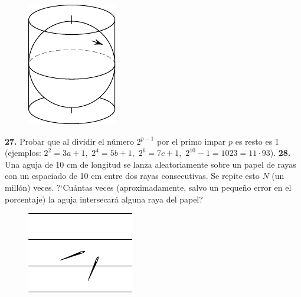 \documentclass[12pt, spanish]{article}  %
\begin{document}
\begin{figure}[h]
\centering
\footnotesize
\includegraphics[scale=1]{taskbook-10}
\end{figure}

\newpage
\noindent
{\bf 27.} Probar que al dividir el n\'umero $2^{p-1}$ por el primo impar $p$ es resto es 1
(ejemplos: $2^2 = 3a +1,$ $2^4 = 5b+1,$ $2^6 = 7c+1,$ 
$2^{10} - 1 = 1023 = 11\cdot 93$).  
\newline\newline\quad
{\bf 28.} Una aguja de 10 cm de longitud se lanza aleatoriamente sobre un papel de rayas con un espaciado de 10 cm entre dos rayas consecutivas. 
Se repite esto $N$ (un mill\'on) veces. 
?`Cu\'antas veces (aproximadamente, salvo un peque\~no error en el porcentaje) la aguja intersecar\'a alguna raya del papel?
\begin{figure}[h]
\centering
\footnotesize
\includegraphics[scale=1]{taskbook-12}
\end{figure}
\end{document}
